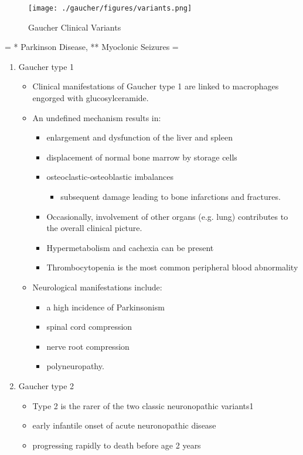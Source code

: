 \documentclass{scrartcl}
\begin{document}
\begin{enumerate}
\begin{figure}[htbp]
\centering
\texttt{[image: ./gaucher/figures/variants.png]}
\caption{\label{fig:org2b16d98}
Gaucher Clinical Variants}
\end{figure}

= * Parkinson Disease, ** Myoclonic Seizures =

\begin{enumerate}
\item Gaucher type 1
\label{sec:orgd439a80}
\begin{itemize}
\item Clinical manifestations of Gaucher type 1 are linked to macrophages
engorged with glucosylceramide.

\item An undefined mechanism results in:
\begin{itemize}
\item enlargement and dysfunction of the liver and spleen
\item displacement of normal bone marrow by storage cells
\item osteoclastic-osteoblastic imbalances
\begin{itemize}
\item subsequent damage leading to bone infarctions and fractures.
\end{itemize}
\item Occasionally, involvement of other organs (e.g. lung) contributes
to the overall clinical picture.
\item Hypermetabolism and cachexia can be present
\item Thrombocytopenia is the most common peripheral blood abnormality
\end{itemize}

\item Neurological manifestations include:
\begin{itemize}
\item a high incidence of Parkinsonism
\item spinal cord compression
\item nerve root compression
\item polyneuropathy.
\end{itemize}
\end{itemize}

\item Gaucher type 2
\label{sec:org5e11b42}
\begin{itemize}
\item Type 2 is the rarer of the two classic neuronopathic variants1
\item early infantile onset of acute neuronopathic disease
\item progressing rapidly to death before age 2 years


\end{itemize}
\end{enumerate}
\end{enumerate}
\end{document}
